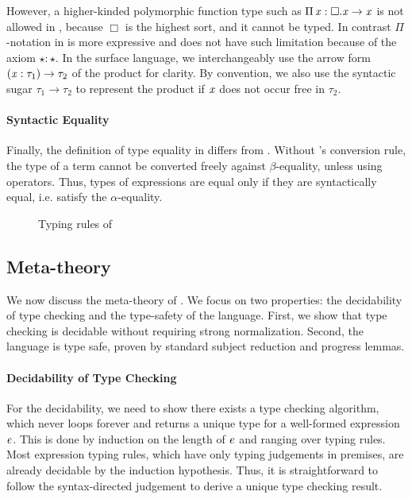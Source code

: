 However, a higher-kinded polymorphic function type such as $\Pi \, \mathit{x}  :  \Box  .  \mathit{x}  \rightarrow  \mathit{x}$ is not allowed in \cc, because $\Box$ is
the highest sort, and it cannot be typed. In contrast $ \Pi $-notation in
\ecore is more expressive and does not have such limitation because of
the axiom $\star:\star$. In the surface language, we
interchangeably use the arrow form $(  \mathit{x}  :  \tau_{{\mathrm{1}}}  )  \rightarrow  \tau_{{\mathrm{2}}}$ of the product for
clarity. By convention, we also use the syntactic sugar $\tau_{{\mathrm{1}}}  \longrightarrow  \tau_{{\mathrm{2}}}$ to represent the product if $\mathit{x}$ does not occur free in
$\tau_{{\mathrm{2}}}$.

\paragraph{Syntactic Equality}
Finally, the definition of type equality in \ecore differs from
\cc. Without \cc's conversion rule, the type of a term cannot be
converted freely against $\beta$-equality, unless using \cast
operators. Thus, types of expressions are equal only if they are
syntactically equal, i.e. satisfy the $\alpha$-equality.

\begin{figure}
    \ottdefnctx{}\ottinterrule
    \ottdefnexpr{}
    \caption{Typing rules of \ecore}
    \label{fig:ecore:typing}
\end{figure}

\subsection{Meta-theory}\label{sec:ecore:meta}
We now discuss the meta-theory of \ecore. We focus on two properties: the
decidability of type checking and the type-safety of the language. First, we
show that type checking \ecore is decidable without requiring strong
normalization. Second, the
language is type safe, proven by standard subject reduction and progress
lemmas.

\paragraph{Decidability of Type Checking}
For the decidability, we need to show there exists a type checking algorithm,
which never loops forever and returns a unique type for a well-formed
expression $\mathit{e}$. This is done by induction on the length of $\mathit{e}$ and
ranging over typing rules. Most expression typing rules, which have only typing
judgements in premises, are already decidable by the induction hypothesis. Thus, it
is straightforward to follow the syntax-directed judgement to derive a unique
type checking result.


